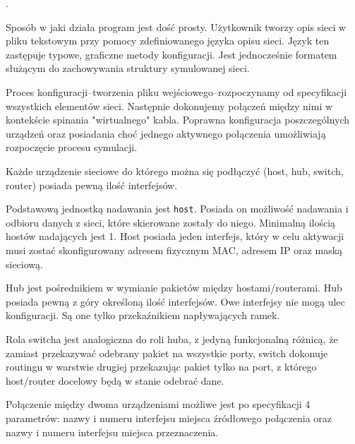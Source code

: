 \smallskip
{}.
\smallskip

\noindent
Sposób w jaki działa program jest dość prosty. Użytkownik tworzy opis sieci
w pliku tekstowym przy pomocy zdefiniowanego języka opisu sieci.  Język ten
zastępuje typowe, graficzne metody konfiguracji. Jest jednocześnie formatem
służącym do zachowywania struktury symulowanej sieci.

Proces konfiguracji--tworzenia pliku wejściowego--rozpoczynamy od
specyfikacji wszystkich elementów sieci. Następnie dokonujemy połączeń
między nimi w kontekście spinania "wirtualnego" kabla. Poprawna konfiguracja
poszczególnych urządzeń oraz posiadania choć jednego aktywnego połączenia
umożliwiają rozpoczęcie procesu symulacji.

Każde urządzenie sieciowe do którego można się podłączyć (host, hub, switch,
router) posiada pewną ilość interfejsów. 

Podstawową jednostką nadawania jest {\tt host}.  Posiada on możliwość
nadawania i odbioru danych z sieci, które skierowane zostały do niego.
Minimalną ilością hostów nadających jest 1.  Host posiada jeden interfejs,
który w celu aktywacji musi zostać skonfigurowany adresem fizycznym MAC,
adresem IP oraz maską sieciową.

Hub jest pośrednikiem w wymianie pakietów między hostami/routerami.  Hub
posiada pewną z góry określoną ilość interfejsów. Owe interfejsy nie mogą
ulec konfiguracji. Są one tylko przekaźnikiem napływających ramek.

\smallskip
{}
\smallskip

\noindent 
Rola switcha jest analogiczna do roli huba, z jedyną funkcjonalną różnicą,
że zamiast przekazywać odebrany pakiet na wszystkie porty, switch dokonuje
routingu w warstwie drugiej przekazując pakiet tylko na port, z którego
host/router docelowy będą w stanie odebrać dane.

Połączenie między dwoma urządzeniami możliwe jest po specyfikacji 4
parametrów: nazwy i numeru interfejsu miejsca źródłowego połączenia oraz
nazwy i numeru interfejsu miejsca przeznaczenia.

